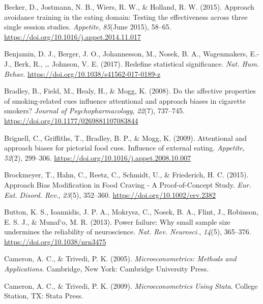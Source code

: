 \documentclass[man,floatsintext]{apa6}
\begin{document}
\leavevmode\hypertarget{ref-becker_approach_2015-1}{}%
Becker, D., Jostmann, N. B., Wiers, R. W., \& Holland, R. W. (2015). Approach avoidance training in the eating domain: Testing the effectiveness across three single session studies. \emph{Appetite}, \emph{85}(June 2015), 58--65. \url{https://doi.org/10.1016/j.appet.2014.11.017}

\leavevmode\hypertarget{ref-benjamin_redefine_2017-1}{}%
Benjamin, D. J., Berger, J. O., Johannesson, M., Nosek, B. A., Wagenmakers, E.-J., Berk, R., \ldots{} Johnson, V. E. (2017). Redefine statistical significance. \emph{Nat. Hum. Behav.} \url{https://doi.org/10.1038/s41562-017-0189-z}

\leavevmode\hypertarget{ref-bradley_affective_2008}{}%
Bradley, B., Field, M., Healy, H., \& Mogg, K. (2008). Do the affective properties of smoking-related cues influence attentional and approach biases in cigarette smokers? \emph{Journal of Psychopharmacology}, \emph{22}(7), 737--745. \url{https://doi.org/10.1177/0269881107083844}

\leavevmode\hypertarget{ref-brignell_attentional_2009}{}%
Brignell, C., Griffiths, T., Bradley, B. P., \& Mogg, K. (2009). Attentional and approach biases for pictorial food cues. Influence of external eating. \emph{Appetite}, \emph{52}(2), 299--306. \url{https://doi.org/10.1016/j.appet.2008.10.007}

\leavevmode\hypertarget{ref-brockmeyer_approach_2015-1}{}%
Brockmeyer, T., Hahn, C., Reetz, C., Schmidt, U., \& Friederich, H. C. (2015). Approach Bias Modification in Food Craving - A Proof-of-Concept Study. \emph{Eur. Eat. Disord. Rev.}, \emph{23}(5), 352--360. \url{https://doi.org/10.1002/erv.2382}

\leavevmode\hypertarget{ref-button_power_2013}{}%
Button, K. S., Ioannidis, J. P. A., Mokrysz, C., Nosek, B. A., Flint, J., Robinson, E. S. J., \& Munaf\a`o, M. R. (2013). Power failure: Why small sample size undermines the reliability of neuroscience. \emph{Nat. Rev. Neurosci.}, \emph{14}(5), 365--376. \url{https://doi.org/10.1038/nrn3475}

\leavevmode\hypertarget{ref-cameron_microeconometrics_2005}{}%
Cameron, A. C., \& Trivedi, P. K. (2005). \emph{Microeconometrics: Methods and Applications}. Cambridge, New York: Cambridge University Press.

\leavevmode\hypertarget{ref-cameron_microeconometrics_2009}{}%
Cameron, A. C., \& Trivedi, P. K. (2009). \emph{Microeconometrics Using Stata}. College Station, TX: Stata Press.
\end{document}
